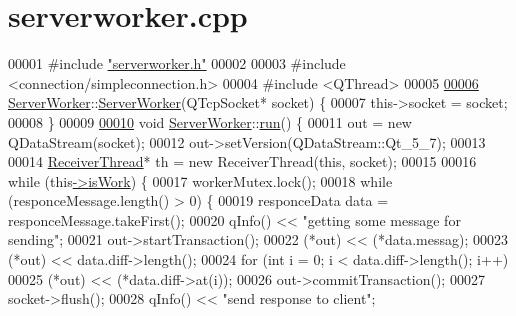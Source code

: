 \hypertarget{a00107_source}{}\section{serverworker.\+cpp}
\label{a00107_source}

\begin{DoxyCode}
00001 \textcolor{preprocessor}{#}\textcolor{preprocessor}{include} \hyperlink{a00110}{"serverworker.h"}
00002 
00003 \textcolor{preprocessor}{#}\textcolor{preprocessor}{include} \textcolor{preprocessor}{<}\textcolor{preprocessor}{connection}\textcolor{preprocessor}{/}\textcolor{preprocessor}{simpleconnection}\textcolor{preprocessor}{.}\textcolor{preprocessor}{h}\textcolor{preprocessor}{>}
00004 \textcolor{preprocessor}{#}\textcolor{preprocessor}{include} \textcolor{preprocessor}{<}\textcolor{preprocessor}{QThread}\textcolor{preprocessor}{>}
00005 
\hyperlink{a00185_aa8aee43d415cf337417a1d1f180ef03a}{00006} \hyperlink{a00185_ab80ef665f93d81c71a83aa42f8d888df}{ServerWorker}::\hyperlink{a00185_aa8aee43d415cf337417a1d1f180ef03a}{ServerWorker}(QTcpSocket* socket) \{
00007   \textcolor{keyword}{this}->socket = socket;
00008 \}
00009 
\hyperlink{a00185_a8b4f9a11d13f0b4990ae72f87da010df}{00010} \textcolor{keywordtype}{void} \hyperlink{a00185_ab80ef665f93d81c71a83aa42f8d888df}{ServerWorker}::\hyperlink{a00185_a8b4f9a11d13f0b4990ae72f87da010df}{run}() \{
00011   out = \textcolor{keyword}{new} QDataStream(socket);
00012   out->setVersion(QDataStream::Qt\_5\_7);
00013 
00014   \hyperlink{a00193}{ReceiverThread}* th = \textcolor{keyword}{new} ReceiverThread(\textcolor{keyword}{this}, socket);
00015 
00016   \textcolor{keywordflow}{while} (\textcolor{keyword}{this}\hyperlink{a00185_a237b637e43a66980b16463bab0b38ce4}{->}\hyperlink{a00185_a237b637e43a66980b16463bab0b38ce4}{isWork}) \{
00017     workerMutex.lock();
00018     \textcolor{keywordflow}{while} (responceMessage.length() > 0) \{
00019       responceData data = responceMessage.takeFirst();
00020       qInfo() << \textcolor{stringliteral}{"getting some message for sending"};
00021       out->startTransaction();
00022       (*out) << (*data.messag);
00023       (*out) << data.diff->length();
00024       \textcolor{keywordflow}{for} (\textcolor{keywordtype}{int} i = 0; i < data.diff->length(); i++)
00025         (*out) << (*data.diff->at(i));
00026       out->commitTransaction();
00027       socket->flush();
00028       qInfo() << \textcolor{stringliteral}{"send  response to client"};

\end{DoxyCode}
